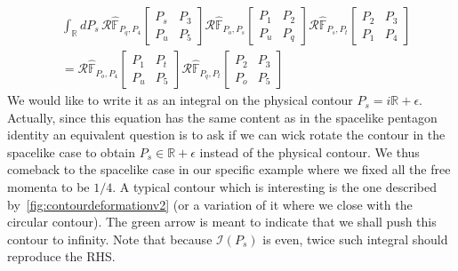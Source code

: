 \documentclass[11pt]{article}
\begin{document}
\begin{equation}\label{eq:fakepentagon}
\begin{aligned}
    &\int_{\mathbb{R}} dP_s \, \mathcal{R}\hat{\mathbb{F}}_{P_q, P_4} 
   \begin{bmatrix}
    P_s & P_3 \\
    P_u & P_5
\end{bmatrix}
\mathcal{R}\hat{\mathbb{F}}_{P_o, P_s} 
   \begin{bmatrix}
    P_1 & P_2 \\
    P_u & P_q
\end{bmatrix}
\mathcal{R}\hat{\mathbb{F}}_{P_s, P_t} 
   \begin{bmatrix}
    P_2 & P_3 \\
    P_1 & P_4
\end{bmatrix}\\
&= \mathcal{R}\hat{\mathbb{F}}_{P_o, P_4} 
   \begin{bmatrix}
    P_1 & P_t \\
    P_u & P_5
\end{bmatrix}
\mathcal{R}\hat{\mathbb{F}}_{P_q, P_t} 
   \begin{bmatrix}
    P_2 & P_3 \\
    P_o & P_5
\end{bmatrix}
\end{aligned}
\end{equation}
We would like to write it as an integral on the physical contour $P_s = i\mathbb{R}+\epsilon$. Actually, since this equation has the same content as in the spacelike pentagon identity an equivalent question is to ask if we can wick rotate the contour in the spacelike case to obtain $P_s \in \mathbb{R}+\epsilon$ instead of the physical contour. We thus comeback to the spacelike case in our specific example where we fixed all the free momenta to be $1/4$. A typical contour which is interesting is the one described by~\ref{fig:contourdeformationv2} (or a variation of it where we close with the circular contour). The green arrow is meant to indicate that we shall push this contour to infinity. Note that because $\mathcal{I}(P_s)$ is even, twice such integral should reproduce the RHS.
\end{document}
